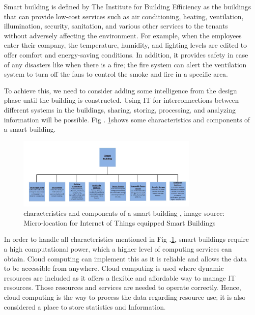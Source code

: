 \documentclass[conference]{IEEEtran}
\begin{document}
Smart building is defined by The Institute for Building Efficiency \cite{smartB} \cite{mic}as the buildings that can provide low-cost services such as air conditioning, heating, ventilation, illumination, security, sanitation, and various other services to the tenants without adversely affecting the environment. For example, when the employees enter their company, the temperature, humidity, and lighting levels are edited to offer comfort and energy-saving conditions. In addition, it provides safety in case of any disasters like when there is a fire; the fire system can alert the ventilation system to turn off the fans to control the smoke and fire in a specific area.

To achieve this, we need to consider adding some intelligence from the design phase until the building is constructed. Using IT for interconnections between different systems in the buildings, sharing, storing, processing, and analyzing information will be possible. Fig . \ref{char}shows some characteristics and components
of a smart building. 



\begin{figure}[h!]
	\centering
	\includegraphics[width=3.5in]{charsb.png}
	\caption{\label{char}  characteristics and components
of a smart building
		, image source: Micro-location for Internet of Things equipped
Smart Buildings
		\cite{mic} }
\end{figure}


In order to handle all characteristics mentioned in Fig .\ref{char}, smart buildings require a high computational power, which a higher level of computing services can obtain. Cloud computing can implement this as it is reliable and allows the data to be accessible from anywhere. Cloud computing is used where dynamic resources are included as it offers a flexible and affordable way to manage IT resources. Those resources and services are needed to operate correctly. Hence, cloud computing is the way to process the data regarding resource use; it is also considered a place to store statistics and Information. \cite{frame}
\end{document}
